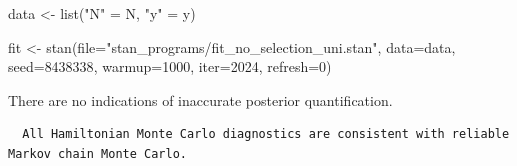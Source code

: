 \documentclass[
  letterpaper,
  DIV=11,
  numbers=noendperiod]{scrartcl}
\newenvironment{Shaded}{\begin{snugshade}}{\end{snugshade}}
\newcommand{\AttributeTok}[1]{\textcolor[rgb]{0.40,0.45,0.13}{#1}}
\newcommand{\DecValTok}[1]{\textcolor[rgb]{0.68,0.00,0.00}{#1}}
\newcommand{\FunctionTok}[1]{\textcolor[rgb]{0.28,0.35,0.67}{#1}}
\newcommand{\NormalTok}[1]{\textcolor[rgb]{0.00,0.23,0.31}{#1}}
\newcommand{\OtherTok}[1]{\textcolor[rgb]{0.00,0.23,0.31}{#1}}
\newcommand{\SpecialCharTok}[1]{\textcolor[rgb]{0.37,0.37,0.37}{#1}}
\newcommand{\StringTok}[1]{\textcolor[rgb]{0.13,0.47,0.30}{#1}}
\begin{document}
\begin{Shaded}
\begin{Highlighting}[]
\NormalTok{data }\OtherTok{\textless{}{-}} \FunctionTok{list}\NormalTok{(}\StringTok{"N"} \OtherTok{=}\NormalTok{ N, }\StringTok{"y"} \OtherTok{=}\NormalTok{ y)}

\NormalTok{fit }\OtherTok{\textless{}{-}} \FunctionTok{stan}\NormalTok{(}\AttributeTok{file=}\StringTok{"stan\_programs/fit\_no\_selection\_uni.stan"}\NormalTok{,}
            \AttributeTok{data=}\NormalTok{data, }\AttributeTok{seed=}\DecValTok{8438338}\NormalTok{,}
            \AttributeTok{warmup=}\DecValTok{1000}\NormalTok{, }\AttributeTok{iter=}\DecValTok{2024}\NormalTok{, }\AttributeTok{refresh=}\DecValTok{0}\NormalTok{)}
\end{Highlighting}
\end{Shaded}

There are no indications of inaccurate posterior quantification.

\begin{Shaded}
\end{Shaded}

\begin{verbatim}
  All Hamiltonian Monte Carlo diagnostics are consistent with reliable
Markov chain Monte Carlo.
\end{verbatim}

\begin{Shaded}
\end{Shaded}
\end{document}
